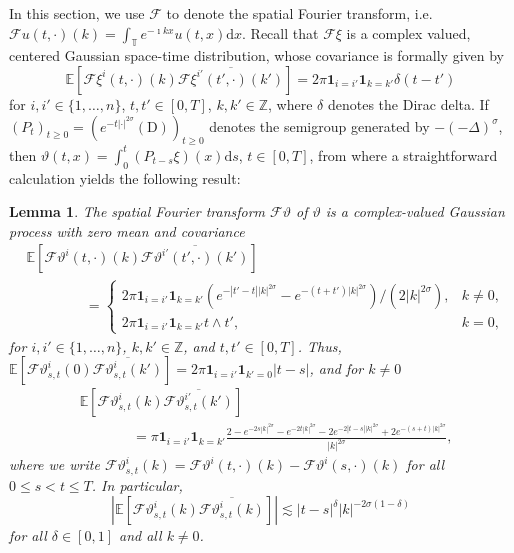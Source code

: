 \documentclass[a4paper,11pt]{article}
\newcommand{\mathD}{\mathrm{D}}
\newcommand{\mathd}{\mathrm{d}}
\newtheorem{lemma}[theorem]{Lemma}
\theoremstyle{remark}
\newcommand{\Z}{\mathbb{Z}}
\newcommand{\E}{\mathbb{E}}
\newcommand{\CF}{\ensuremath{\mathscr{F}}}
\begin{document}
In this section, we use $\CF$ to denote the spatial Fourier transform, i.e. $\CF u(t,\cdot) (k) = \int_\mathbb{T} e^{-\imath k x} u(t,x) \mathd x$. Recall that $\CF \xi$ is a complex valued, centered Gaussian space-time distribution, whose covariance is formally given by
\[
   \E[\CF \xi^i (t,\cdot)(k) \overline{\CF \xi^{i'} (t',\cdot)(k')}] = 2\pi \mathbf{1}_{i=i'} \mathbf{1}_{k=k'} \delta(t - t')
\]
for $i,i'\in \{1, \dots, n\}$, $t, t' \in [0,T]$, $k, k' \in \Z$, where $\delta$ denotes the Dirac delta. If $(P_t)_{t\geqslant 0} = (e^{-t |\cdot|^{2\sigma}}(\mathD))_{t \geqslant 0}$ denotes the semigroup generated by $-(-\Delta)^\sigma$, then $\vartheta(t,x) = \int_{0}^t (P_{t-s} \xi)(x)\mathd s$, $t \in [0,T]$, from where a straightforward calculation yields the following result:


\begin{lemma}\label{l:heat covariance}
   The spatial Fourier transform $\CF \vartheta$ of $\vartheta$ is a complex-valued Gaussian process with zero mean and covariance
   \begin{align*}%
      &\E[\CF{\vartheta}^i(t,\cdot)(k) \overline{\CF{\vartheta}^{i'}(t',\cdot)(k')}] \\
      &\hspace{50pt}= \begin{cases}
                                                                                                       2 \pi \mathbf{1}_{i=i'} \mathbf{1}_{k=k'} (e^{-|t'-t| | k |^{2 \sigma}} - e^{-(t+t')|k|^{2\sigma} })/(2|k|^{2 \sigma}), & k \neq 0,\\
                                                                                                       2\pi \mathbf{1}_{i=i'} \mathbf{1}_{k=k'} t \wedge t', & k = 0,
                                                                                                   \end{cases}
   \end{align*}
   for $i,i' \in \{1, \dots, n\}$, $k, k' \in \mathbb{Z}$, and $t,t' \in [0,T]$. Thus, $\E[\CF{\vartheta}^i_{s,t}(0) \overline{\CF{\vartheta}^{i}_{s,t}(k')}] = 2\pi \mathbf{1}_{i=i'} \mathbf{1}_{k'=0} |t-s|$, and for $k\neq 0$
   \begin{align*}
      &\E[\CF{\vartheta}^i_{s,t}(k) \overline{\CF{\vartheta}^{i'}_{s,t}(k')}] \\
      &\hspace{45pt} = \pi \mathbf{1}_{i=i'} \mathbf{1}_{k=k'} \frac{2 - e^{-2 s | k |^{2 \sigma}}  - e^{-2 t | k |^{2 \sigma}} - 2 e^{- 2 |t-s| |k|^{2\sigma}} + 2 e^{-(s+t)|k|^{2\sigma}}}{|k|^{2 \sigma}},
   \end{align*}
   where we write $\CF{\vartheta}^i_{s,t}(k) = \CF{\vartheta}^i(t,\cdot)(k) - \CF{\vartheta}^i(s,\cdot)(k)$ for all $0 \leqslant s < t \leqslant T$. In particular,
   \begin{equation}
      |\E[\CF{\vartheta}^i_{s,t}(k) \overline{\CF{\vartheta}^{i}_{s,t}(k)}]| \lesssim |t-s|^{\delta} |k|^{-2\sigma(1 - \delta)}
   \end{equation}
   for all $\delta \in [0,1]$ and all $k \neq 0$.
\end{lemma}
\end{document}
